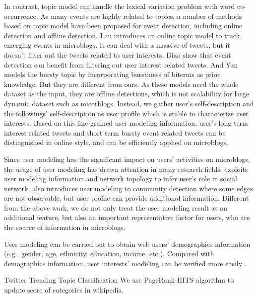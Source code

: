 \documentclass{sig-alternate-05-2015}
\begin{document}
In contrast, topic model can handle the lexical variation problem with word co-occurrence\cite{blei2003latent}.
As many events are highly related to topics, a number of methods based on topic model have been proposed for event detection, including online detection and offline detection.
Lau\cite{lau2012line} introduces an online topic model to track emerging events in microblogs.
It can deal with a massive of tweets, but it doesn't filter out the tweets related to user interests.
Diao\cite{timeUserLDA2012finding}\cite{diao2013unified} show that event detection can benefit from filtering out user interest related tweets. 
And Yan\cite{Yan:2015wm} models the bursty topic by incorporating burstiness of biterms as prior knowledge.
But they are different from ours.
As these models need the whole dataset as the input, they are offline detections, which is not scalability for large dynamic dataset such as micorblogs.
Instead, we gather user's self-description and the followings' self-description as user profile which is stable to characterize user interests. 
Based on this fine-grained user modeling information, user's long term interest related tweets and short term bursty event related tweets can be distinguished in online style, and can be efficiently applied on microblogs.

Since user modeling has the significant impact on users' activities on microblogs, the usage of user modeling has drawn attention in many research fields. 
\cite{zhao2013inferring} exploits user modeling information and network topology to infer user's role in social network.
\cite{yoshida2013toward} also introduces user modeling to community detection where some edges are not observable, but user profile can provide additional information.
Different from the above work, we do not only treat the user modeling result as an additional feature, but also an important representative factor for users, who are the source of information in microblogs.

User modeling can be carried out to obtain web users' demographics information \cite{culotta2015predicting} (e.g., gender, age, ethnicity, education, income, etc.).
Compared with demographics information, user interests' modeling can be verified more easily \cite{faralli2015large}. 


Twitter Trending Topic Classification
We use PageRank-HITS\cite{Yan:2015wq} algorithm to update score of categories in wikipedia.
\end{document}
